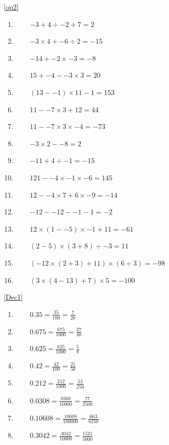\documentclass[a4paper,12pt]{article}
\begin{document}
\ref{op2}
	\begin{multicols}{2}
	\begin{enumerate}[label=\footnotesize \roman*)]
		\item ~~~~$-3+4\div-2+7=2$
		\item ~~~~$-3\times4+-6\div2=-15$
		\item ~~~~$-14+-2\times-3=-8$
		\item ~~~~$15+-4--3\times3=20$
		\item ~~~~$(13--1)\times11-1=153$
		\item ~~~~$11--7\times3+12=44$
		\item ~~~~$11--7\times3\times-4=-73$
		\item ~~~~$-3\times2--8=2$
		\item ~~~~$-11+4\div-1=-15$
		\item ~~~~$121--4\times-1\times-6=145$
		\item ~~~~$12--4\times7+6\times-9=-14$
		\item ~~~~$-12--12--1-1=-2$
		\item ~~~~$12\times(1--5)\times-1+11=-61$
		\item ~~~~$(2-5)\times(3+8)\div-3=11$
		\item ~~~~$(-12\times(2+3)+11)\times(6\div3)=-98$
		\item ~~~~$(3\times(4-13)+7)\times5=-100$
	\end{enumerate}
\end{multicols}
\ref{Dec1}
\begin{multicols}{2}
	\begin{enumerate}
		\item ~~~~$\displaystyle 0.35=\frac{35}{100}=\frac{7}{20}$
		\item ~~~~$\displaystyle 0.675=\frac{675}{1000}=\frac{27}{40}$
		\item ~~~~$\displaystyle 0.625=\frac{625}{1000}=\frac{5}{8}$
		\item ~~~~$\displaystyle 0.42=\frac{42}{100}=\frac{21}{50}$
		\item ~~~~$\displaystyle 0.212=\frac{212}{1000}=\frac{53}{250}$
		\item ~~~~$\displaystyle 0.0308=\frac{0308}{10000}=\frac{77}{2500}$
		\item ~~~~$\displaystyle 0.10608=\frac{10608}{100000}=\frac{663}{6250}$
		\item ~~~~$\displaystyle 0.3042=\frac{3042}{10000}=\frac{1521}{5000}$
	\end{enumerate}
\end{multicols}
\end{document}

